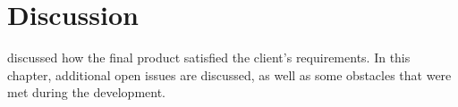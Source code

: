 \chapter{Discussion}
\label{cha:discussion}

 discussed how the final product satisfied the client's
requirements.  In this chapter, additional open issues are discussed, as well as
some obstacles that were met during the development.









